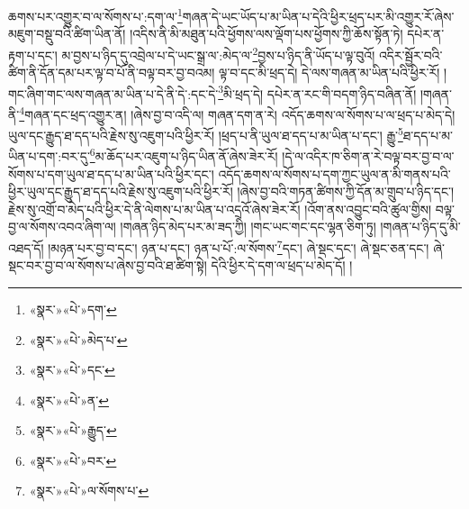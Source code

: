 ཆགས་པར་འགྱུར་བ་ལ་སོགས་པ་:དག་ལ་\footnote{«སྣར་»«པེ་»དག་}གཞན་དེ་ཡང་ཡོད་པ་མ་ཡིན་པ་དེའི་ཕྱིར་ཕྲད་པར་མི་འགྱུར་རོ་ཞེས་མཇུག་བསྡུ་བའི་ཚིག་ཡིན་ནོ། །འདིས་ནི་མི་མཐུན་པའི་ཕྱོགས་ལས་ལྡོག་པས་ཕྱོགས་ཀྱི་ཆོས་སྟོན་ཏེ། དཔེར་ན་རྟག་པ་དང་། མ་བྱས་པ་ཉིད་དུ་འབྲེལ་པ་དེ་ཡང་སྒྲ་ལ་:མེད་ལ་\footnote{«སྣར་»«པེ་»མེད་པ་}བྱས་པ་ཉིད་ནི་ཡོད་པ་ལྟ་བུའོ། འདིར་སྦྱོར་བའི་ཚིག་ནི་དོན་དམ་པར་ལྟ་བ་པོ་ནི་བལྟ་བར་བྱ་བའམ། ལྟ་བ་དང་མི་ཕྲད་དེ། དེ་ལས་གཞན་མ་ཡིན་པའི་ཕྱིར་རོ། །གང་ཞིག་གང་ལས་གཞན་མ་ཡིན་པ་དེ་ནི་དེ་:དང་དེ་\footnote{«སྣར་»«པེ་»དང་}མི་ཕྲད་དེ། དཔེར་ན་རང་གི་བདག་ཉིད་བཞིན་ནོ། །གཞན་ནི་\footnote{«སྣར་»«པེ་»ན་}གཞན་དང་ཕྲད་འགྱུར་ན། །ཞེས་བྱ་བ་འདི་ལ། གཞན་དག་ན་རེ། འདོད་ཆགས་ལ་སོགས་པ་ལ་ཕྲད་པ་མེད་དེ། ཡུལ་དང་རྒྱུད་ཐ་དད་པའི་རྗེས་སུ་འཇུག་པའི་ཕྱིར་རོ། །ཕྲད་པ་ནི་ཡུལ་ཐ་དད་པ་མ་ཡིན་པ་དང་། རྒྱུ་\footnote{«སྣར་»«པེ་»རྒྱུད་}ཐ་དད་པ་མ་ཡིན་པ་དག་:བར་དུ་\footnote{«སྣར་»«པེ་»བར་}མ་ཆོད་པར་འཇུག་པ་ཉིད་ཡིན་ནོ་ཞེས་ཟེར་རོ། །དེ་ལ་འདིར་ཁ་ཅིག་ན་རེ་བལྟ་བར་བྱ་བ་ལ་སོགས་པ་དག་ཡུལ་ཐ་དད་པ་མ་ཡིན་པའི་ཕྱིར་དང་། འདོད་ཆགས་ལ་སོགས་པ་དག་ཀྱང་ཡུལ་ན་མི་གནས་པའི་ཕྱིར་ཡུལ་དང་རྒྱུད་ཐ་དད་པའི་རྗེས་སུ་འཇུག་པའི་ཕྱིར་རོ། །ཞེས་བྱ་བའི་གཏན་ཚིགས་ཀྱི་དོན་མ་གྲུབ་པ་ཉིད་དང་། རྗེས་སུ་འགྲོ་བ་མེད་པའི་ཕྱིར་དེ་ནི་ལེགས་པ་མ་ཡིན་པ་འདྲའོ་ཞེས་ཟེར་རོ། །འོག་ནས་འབྱུང་བའི་ཚུལ་གྱིས། བལྟ་བྱ་ལ་སོགས་འབའ་ཞིག་ལ། །གཞན་ཉིད་མེད་པར་མ་ཟད་ཀྱི། །གང་ཡང་གང་དང་ལྷན་ཅིག་ཏུ། །གཞན་པ་ཉིད་དུ་མི་འཐད་དོ། །མཉན་པར་བྱ་བ་དང་། ཉན་པ་དང་། ཉན་པ་པོ་:ལ་སོགས་\footnote{«སྣར་»«པེ་»ལ་སོགས་པ་}དང་། ཞེ་སྡང་དང་། ཞེ་སྡང་ཅན་དང་། ཞེ་སྡང་བར་བྱ་བ་ལ་སོགས་པ་ཞེས་བྱ་བའི་ཐ་ཚིག་སྟེ། དེའི་ཕྱིར་དེ་དག་ལ་ཕྲད་པ་མེད་དོ། །
